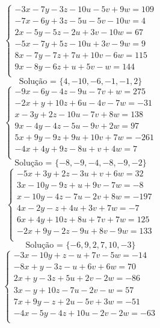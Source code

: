 \documentclass[12pt,oneside,a4paper]{article}
\begin{document}
\vspace{\baselineskip}
\begin{equation*}
\begin{cases}
-3x-7y-3z-10u-5v+9w=109 \\
-7x-6y+3z-5u-5v-10w=4 \\
2x-5y-5z-2u+3v-10w=67 \\
-5x-7y+5z-10u+3v-9w=9 \\
8x-7y-7z+7u+10v-6w=115 \\
9x-8y-6z+u+5v-w=144 \\
\end{cases}
\end{equation*}
\begin{equation*}
\text{Solução = }\{4,-10,-6,-1,-1,2\}
\end{equation*}
\vspace{\baselineskip}
\begin{equation*}
\begin{cases}
-9x-6y-4z-9u-7v+w=275 \\
-2x+y+10z+6u-4v-7w=-31 \\
x-3y+2z-10u-7v+8w=138 \\
9x-4y-4z-5u-9v+2w=97 \\
5x+9y-9z+9u+10v+7w=-261 \\
-4x+4y+9z-8u+v+4w=7 \\
\end{cases}
\end{equation*}
\begin{equation*}
\text{Solução = }\{-8,-9,-4,-8,-9,-2\}
\end{equation*}
\vspace{\baselineskip}
\begin{equation*}
\begin{cases}
-5x+3y+2z-3u+v+6w=32 \\
3x-10y-9z+u+9v-7w=-8 \\
x-10y-4z-7u-2v+8w=-197 \\
4x-2y-z+4u+3v+7w=-7 \\
6x+4y+10z+8u+7v+7w=125 \\
-2x+9y-2z-9u+8v-9w=133 \\
\end{cases}
\end{equation*}
\begin{equation*}
\text{Solução = }\{-6,9,2,7,10,-3\}
\end{equation*}
\vspace{\baselineskip}
\begin{equation*}
\begin{cases}
-3x-10y+z-u+7v-5w=-14 \\
-8x+y-3z-u+6v+6w=70 \\
2x+y-3z+5u+2v-2w=-86 \\
3x-y+10z-7u-2v-w=57 \\
7x+9y-z+2u-5v+3w=-51 \\
-4x-5y-4z+10u-2v-2w=-63 \\
\end{cases}
\end{equation*}
\end{document}
